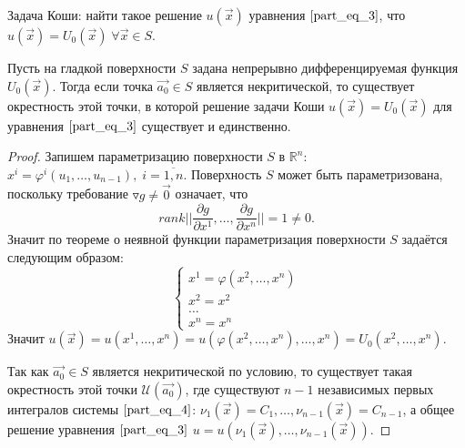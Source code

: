 \documentclass[a4paper, 12pt]{article}
\begin{document}
    Задача Коши: найти такое решение $u(\overrightarrow{x})$ уравнения $\eqref{part_eq_3}$, что $u(\overrightarrow{x}) = U_0(\overrightarrow{x}) \; \forall \overrightarrow{x} \in S$.
    
    \begin{theorem}
        Пусть на гладкой поверхности $S$ задана непрерывно дифференцируемая функция $U_0(\overrightarrow{x})$. Тогда если точка $\overrightarrow{a_0} \in S$ является некритической, то существует окрестность этой точки, в которой решение задачи Коши $u(\overrightarrow{x}) = U_0(\overrightarrow{x})$ для уравнения $\eqref{part_eq_3}$ существует и единственно.
    \end{theorem}
    \begin{proof}
        Запишем параметризацию поверхности $S$ в $\mathbb{R}^n$: $x^i = \varphi^i(u_1, \dots, u_{n - 1}), \; i = \overline{1, n}$. Поверхность $S$ может быть параметризована, поскольку требование $\triangledown g \neq \overrightarrow{0}$ означает, что 
        \begin{equation*}
            rank \bigg| \bigg| \frac{\partial g}{\partial x^{1}}, \dots, \frac{\partial g}{\partial x^{n}} \bigg| \bigg| = 1 \neq 0.
        \end{equation*}
        Значит по теореме о неявной функции параметризация поверхности $S$ задаётся следующим образом:
        \begin{equation*}
            \begin{cases}
                x^1 = \varphi(x^2, \dots, x^n) \\
                x^2 = x^2                      \\
                \dots                          \\
                x^n = x^n
            \end{cases}
        \end{equation*}
        Значит $u(\overrightarrow{x}) = u(x^1, \dots, x^n) = u(\varphi(x^2, \dots, x^n), \dots, x^n) = U_0(x^2, \dots, x^n)$.

        Так как $\overrightarrow{a_0} \in S$ является некритической по условию, то существует такая окрестность этой точки $\mathcal{U} (\overrightarrow{a_0})$, где существуют $n - 1$ независимых первых интегралов системы $\eqref{part_eq_4}$: $\nu_1(\overrightarrow{x}) = C_1, \dots, \nu_{n - 1}(\overrightarrow{x}) = C_{n - 1}$, а общее решение уравнения $\eqref{part_eq_3}$ $u = u(\nu_1(\overrightarrow{x}), \dots, \nu_{n - 1}(\overrightarrow{x}))$. 


\end{proof}
\end{document}
